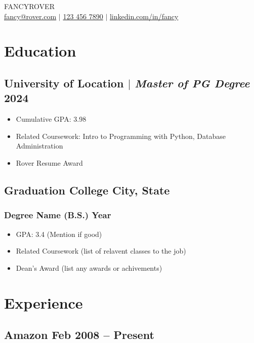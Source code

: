 \documentclass[11pt]{article}
\begin{document}
\begin{center}
    {\fontsize{42}{36}\selectfont \robotothin FANCY\robotoblack ROVER} \\ \medskip
    {\color{icnclr}\faEnvelope[regular]} \href{mailto:hi@example.com}{fancy@rover.com} $|$ 
    {\color{icnclr}} \href{tel:1234567890}{123 456 7890} $|$
    {\color{icnclr}\faLinkedinIn} \href{https://www.linkedin.com/in/}{linkedin.com/in/fancy}
\end{center}

\section{Education}
\subsection{University of Location $|$ {\normalfont\textit{Master of PG Degree}} \hfill 2024}
\begin{itemize}
    \item Cumulative GPA: 3.98
    \item Related Coursework: Intro to Programming with Python, Database Administration
    \item Rover Resume Award
\end{itemize}

\subsection{Graduation College \hfill City, State}
\subsubsection{Degree Name (B.S.) \hfill Year}
\begin{itemize}
    \item GPA: 3.4 (Mention if good)
    \item Related Coursework (list of relavent classes to the job)
    \item Dean's Award (list any awards or achivements)
\end{itemize}

\section{Experience}
\subsection{Amazon \hfill Feb 2008 -- Present}
\end{document}
